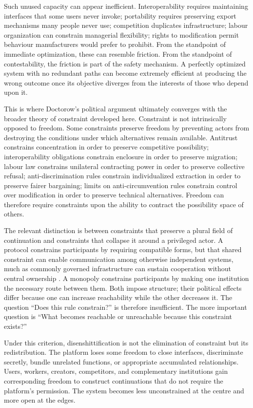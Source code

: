 \documentclass[11pt]{article}
\begin{document}
Such unused capacity can appear inefficient. Interoperability requires maintaining interfaces that some users never invoke; portability requires preserving export mechanisms many people never use; competition duplicates infrastructure; labour organization can constrain managerial flexibility; rights to modification permit behaviour manufacturers would prefer to prohibit. From the standpoint of immediate optimization, these can resemble friction. From the standpoint of contestability, the friction is part of the safety mechanism. A perfectly optimized system with no redundant paths can become extremely efficient at producing the wrong outcome once its objective diverges from the interests of those who depend upon it.

This is where Doctorow's political argument ultimately converges with the broader theory of constraint developed here. Constraint is not intrinsically opposed to freedom. Some constraints preserve freedom by preventing actors from destroying the conditions under which alternatives remain available. Antitrust constrains concentration in order to preserve competitive possibility; interoperability obligations constrain enclosure in order to preserve migration; labour law constrains unilateral contracting power in order to preserve collective refusal; anti-discrimination rules constrain individualized extraction in order to preserve fairer bargaining; limits on anti-circumvention rules constrain control over modification in order to preserve technical alternatives. Freedom can therefore require constraints upon the ability to contract the possibility space of others.

The relevant distinction is between constraints that preserve a plural field of continuation and constraints that collapse it around a privileged actor. A protocol constrains participants by requiring compatible forms, but that shared constraint can enable communication among otherwise independent systems, much as commonly governed infrastructure can sustain cooperation without central ownership \citep{ostrom1990governing}. A monopoly constrains participants by making one institution the necessary route between them. Both impose structure; their political effects differ because one can increase reachability while the other decreases it. The question ``Does this rule constrain?'' is therefore insufficient. The more important question is ``What becomes reachable or unreachable because this constraint exists?''

Under this criterion, disenshittification is not the elimination of constraint but its redistribution. The platform loses some freedom to close interfaces, discriminate secretly, bundle unrelated functions, or appropriate accumulated relationships. Users, workers, creators, competitors, and complementary institutions gain corresponding freedom to construct continuations that do not require the platform's permission. The system becomes less unconstrained at the centre and more open at the edges.
\end{document}

